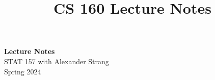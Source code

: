 \documentclass[11pt]{article}
\begin{document}
    \title{CS 160 Lecture Notes}
    
    \thispagestyle{empty}

    \begin{center}
    {\LARGE \bf Lecture Notes}\\
    {\large STAT 157 with Alexander Strang}\\
    Spring 2024
    \end{center}
    
    \tableofcontents

    
     
    
    
    
    
    
    
    
    
    
    
    
    
%     
%     

%     
%     
\end{document}

